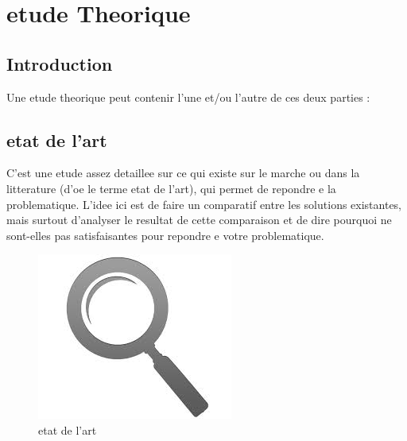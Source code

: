 \setcounter{mtc}{5} %
\chapter{etude Theorique}
\minitoc  %

\graphicspath{{Chapitre1/figures/}}
\pagestyle{fancy}
\fancyhf{}
\fancyhead[R]{\bfseries\rightmark}
\fancyfoot[R]{\thepage}
\renewcommand{\headrulewidth}{0.5pt}
\renewcommand{\footrulewidth}{0pt}
\renewcommand{\chaptermark}[1]{\markboth{\MakeUppercase{\chaptername~\thechapter. #1 }}{}}
\renewcommand{\sectionmark}[1]{\markright{\thechapter.\thesection~ #1}}

\begin{spacing}{1.2}

\section*{Introduction}
Une etude theorique \cite{YOUSFI2015} peut contenir l'une et/ou l'autre de ces deux parties :
\section{etat de l'art} 
C'est une etude assez detaillee sur ce qui existe sur le marche ou dans la litterature (d'oe 
le terme etat de l'art), qui permet de repondre e la problematique. L'idee ici est de faire 
un comparatif entre les solutions existantes, mais surtout d'analyser le resultat de cette 
comparaison et de dire pourquoi ne sont-elles pas satisfaisantes pour repondre e votre 
problematique.
\begin{figure}[!ht]\centering
\includegraphics[scale=0.9]{art.jpg}
\caption{etat de l'art}
\label{fig:fig1}
\end{figure}

\end{spacing}
